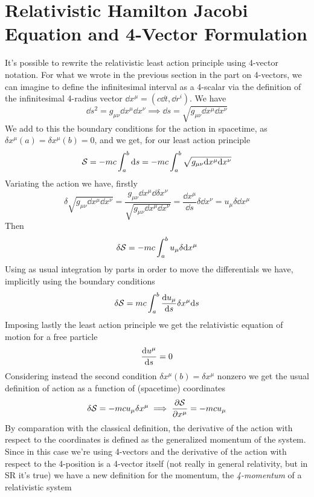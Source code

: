 \documentclass[../admech.tex]{subfiles}
\begin{document}
\section{Relativistic Hamilton Jacobi Equation and 4-Vector Formulation}
It's possible to rewrite the relativistic least action principle using 4-vector notation. For what we wrote in the previous section in the part on 4-vectors, we can imagine to define the infinitesimal interval as a 4-scalar via the definition of the infinitesimal 4-radius vector $\dd x^\mu=(c\dd t,\dd r^i)$. We have
\begin{equation}
	\dd s^2=g_{\mu\nu}\dd x^\mu\dd x^\nu\implies\dd s=\sqrt{g_{\mu\nu}\dd x^\mu\dd x^\nu}
	\label{eq:dsact}
\end{equation}
We add to this the boundary conditions for the action in spacetime, as $\delta x^\mu(a)=\delta x^\mu(b)=0$, and we get, for our least action principle
\begin{equation}
	\mathcal{S}=-mc\int_{a}^{b}\dd s=-mc\int_{a}^{b}\sqrt{g_{\mu\nu}\dd x^\mu\dd x^\nu}
	\label{eq:relact}
\end{equation}
Variating the action we have, firstly
\begin{equation*}
	\delta\sqrt{g_{\mu\nu}\dd x^\mu\dd x^\nu}=\frac{g_{\mu\nu}\dd x^\mu\dd\delta x^\nu}{\sqrt{g_{\mu\nu}\dd x^\mu\dd x^\nu}}=\frac{\dd x^\mu}{\dd s}\delta\dd x^\nu=u_\mu\delta\dd x^\mu
\end{equation*}
Then
\begin{equation*}
	\delta\mathcal{S}=-mc\int_{a}^{b}u_\mu\delta\dd x^\mu
\end{equation*}
Using as usual integration by parts in order to move the differentials we have, implicitly using the boundary conditions
\begin{equation}
	\delta\mathcal{S}=mc\int_{a}^{b}\dv{u_\mu}{s}\delta x^\mu\dd s
	\label{eq:actvarrel}
\end{equation}
Imposing lastly the least action principle we get the relativistic equation of motion for a free particle
\begin{equation}
	\dv{u^\mu}{s}=0
	\label{eq:eqmrel}
\end{equation}
Considering instead the second condition $\delta x^\mu(b)=\delta x^\mu$ nonzero we get the usual definition of action as a function of (spacetime) coordinates
\begin{equation*}
	\delta\mathcal{S}=-mcu_\mu\delta x^\mu\implies\pdv{\mathcal{S}}{x^\mu}=-mcu_\mu
\end{equation*}
By comparation with the classical definition, the derivative of the action with respect to the coordinates is defined as the generalized momentum of the system. Since in this case we're using 4-vectors and the derivative of the action with respect to the 4-position is a 4-vector itself (not really in general relativity, but in SR it's true) we have a new definition for the momentum, the \emph{4-momentum} of a relativistic system
\end{document}

